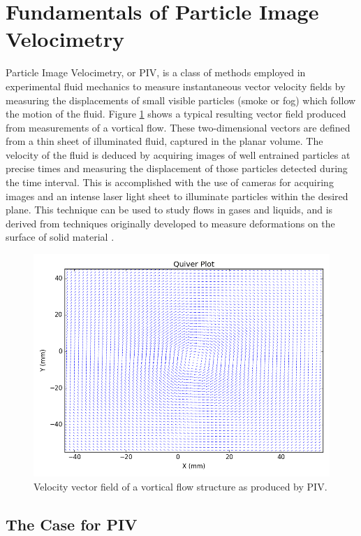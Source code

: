 \section{Fundamentals of Particle Image Velocimetry}

Particle Image Velocimetry, or PIV, is a class of methods employed in 
experimental fluid mechanics to measure instantaneous vector velocity fields by 
measuring the displacements of small visible particles (smoke or fog) which 
follow the motion of the fluid. Figure \ref{fig:quiver_example} shows a typical 
resulting vector field produced from measurements of a vortical flow. 
These two-dimensional vectors are defined from a thin sheet 
of illuminated fluid, captured in the planar volume. The velocity of the fluid 
is deduced by acquiring images of well entrained particles at precise times and 
measuring the displacement of those particles detected during the time 
interval. This is accomplished with the use of cameras for acquiring images 
and an intense laser light sheet to illuminate particles within the desired 
plane. This technique can be used to study flows in gases and liquids, and is 
derived from techniques originally developed to measure deformations on the 
surface of solid material \cite{arroyo1991,adrian1991}.

\begin{figure}[H]
	\centering
	\includegraphics[width=5in]{figs/example_vortex_figs/example_quiver}
	\caption{Velocity vector field of a vortical flow structure as produced by 
	PIV.}
	\label{fig:quiver_example}
\end{figure}

 
\subsection{The Case for PIV}

